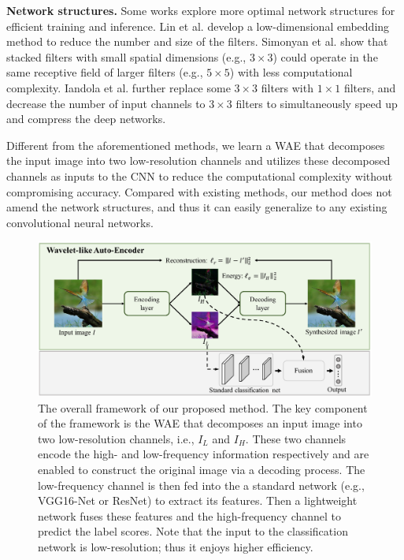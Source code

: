 \documentclass[letterpaper]{article} %
\begin{document}
\noindent\textbf{Network structures. }Some works explore more optimal network structures for efficient training and inference.  Lin et al. \cite{lin2013network} develop a low-dimensional embedding method to reduce the number and size of the filters. Simonyan et al. \cite{simonyan2014very} show that stacked filters with small spatial dimensions (e.g., $3 \times 3$) could operate in the same receptive field of larger filters (e.g., $5 \times 5$) with less computational complexity. Iandola et al. \cite{iandola2016squeezenet} further replace some $3 \times 3$ filters with $1 \times 1$ filters, and decrease the number of input channels to $3 \times 3$ filters to simultaneously speed up and compress the deep networks.

Different from the aforementioned methods, we learn a WAE that decomposes the input image into two low-resolution channels and utilizes these decomposed channels as inputs to the CNN to reduce the computational complexity without compromising accuracy. Compared with existing methods, our method does not amend the network structures, and thus it can easily generalize to any existing convolutional neural networks.



\begin{figure}[htbp]
   \centering
   \includegraphics[width=0.75\linewidth]{framework_v2.pdf}
   \caption{The overall framework of our proposed method. The key component of the framework is the WAE that decomposes an input image into two low-resolution channels, i.e., $I_L$ and $I_H$. These two channels encode the high- and low-frequency information respectively and are enabled to construct the original image via a decoding process. The low-frequency channel is then fed into the a standard network (e.g., VGG16-Net or ResNet) to extract its features. Then a lightweight network fuses these features and the high-frequency channel to predict the label scores. Note that the input to the classification network is low-resolution; thus it enjoys higher efficiency.}
   \label{fig:cls_net}
\end{figure}
\end{document}
